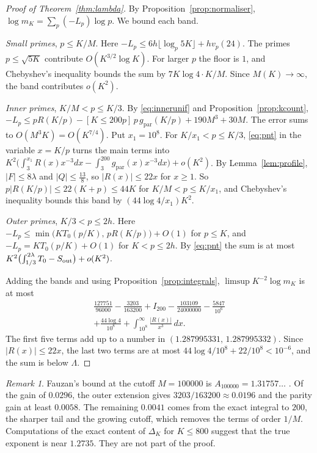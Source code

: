 \documentclass[11pt]{amsart}
\theoremstyle{definition}
\theoremstyle{remark}
\newtheorem{remark}[theorem]{Remark}
\numberwithin{equation}{section}
\newcommand{\gref}{g_{\mathrm{par}}}
\begin{document}
\begin{proof}[Proof of Theorem~\ref{thm:lambda}]
By Proposition~\ref{prop:normaliser}, $\log m_K=\sum_p(-L_p)\log p$. We bound each band.

\emph{Small primes}, $p\le K/M$. Here $-L_p\le6h\lfloor\log_p5K\rfloor+hv_p(24)$. The primes $p\le\sqrt{5K}$
contribute $O(K^{3/2}\log K)$. For larger $p$ the floor is $1$, and Chebyshev's inequality bounds the sum by
$7K\log4\cdot K/M$. Since $M(K)\to\infty$, the band contributes $o(K^2)$.

\emph{Inner primes}, $K/M<p\le K/3$. By \eqref{eq:innerunif} and Proposition~\ref{prop:kcount},
$-L_p\le pR(K/p)-[K\le200p]\,p\,\gref(K/p)+190M^3+30M$. The error sums to $O(M^3K)=O(K^{7/4})$. Put $x_1=10^8$.
For $K/x_1<p\le K/3$, \eqref{eq:pnt} in the variable $x=K/p$ turns the main terms into
$K^2\bigl(\int_3^{x_1}R(x)x^{-3}dx-\int_3^{200}\gref(x)x^{-3}dx\bigr)+o(K^2)$. By Lemma~\ref{lem:profile},
$|F|\le8\lambda$ and $|Q|\le\frac{13}8$, so $|R(x)|\le22x$ for $x\ge1$. So $p|R(K/p)|\le22(K+p)\le44K$ for $K/M<p\le K/x_1$, and Chebyshev's inequality bounds this
band by $(44\log4/x_1)K^2$.

\emph{Outer primes}, $K/3<p\le2h$. Here $-L_p\le\min\bigl(KT_0(p/K),\,pR(K/p)\bigr)+O(1)$ for $p\le K$, and
$-L_p=KT_0(p/K)+O(1)$ for $K<p\le2h$. By \eqref{eq:pnt} the sum is at most
$K^2\bigl(\int_{1/3}^{2\lambda}T_0-S_{\rm out}\bigr)+o(K^2)$.

Adding the bands and using Proposition~\ref{prop:integrals}, $\limsup K^{-2}\log m_K$ is at most
\begin{multline*}
 \frac{127751}{96000}-\frac{3203}{163200}+I_{200}-\frac{103109}{24000000}-\frac{5847}{10^6}\\
 +\frac{44\log4}{10^8}+\int_{10^8}^\infty\frac{|R(x)|}{x^3}\,dx .
\end{multline*}
The first five terms add up to a number in $(1.287995331,\,1.287995332)$. Since $|R(x)|\le22x$, the last two terms
are at most $44\log4/10^8+22/10^8<10^{-6}$, and the sum is below $\Lambda$.
\end{proof}

\begin{remark}
Fauzan's bound at the cutoff $M=100000$ is $A_{100000}=1.31757\ldots$ \cite[(5.20)]{Fauzan2026}. Of the gain of
$0.0296$, the outer extension gives $3203/163200\approx0.0196$ and the parity gain at least $0.0058$. The remaining
$0.0041$ comes from the exact integral to $200$, the sharper tail and the growing cutoff, which removes the terms of
order $1/M$. Computations of the exact content of $\Delta_K$ for
$K\le800$ suggest that the true exponent is near $1.2735$. They are not part of the proof.
\end{remark}
\end{document}
